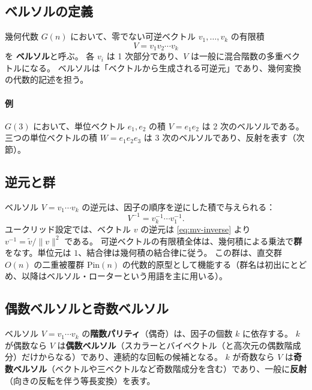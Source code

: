 \documentclass[dvipdfmx,a4paper,oneside]{jsbook}
\numberwithin{equation}{chapter}
\begin{document}
\subsection{ベルソルの定義}

幾何代数 \(G(n)\) において、零でない可逆ベクトル \(v_1,\ldots,v_k\) の有限積
\begin{equation}
  V = v_1 v_2 \cdots v_k
  \label{eq:versor-def}
\end{equation}
を \textbf{ベルソル}と呼ぶ。
各 \(v_i\) は 1 次部分であり、\(V\) は一般に混合階数の多重ベクトルになる。
ベルソルは「ベクトルから生成される可逆元」であり、幾何変換の代数的記述を担う。

\paragraph{例}
\(G(3)\) において、単位ベクトル \(e_1,e_2\) の積 \(V = e_1 e_2\) は 2 次のベルソルである。
三つの単位ベクトルの積 \(W = e_1 e_2 e_3\) は 3 次のベルソルであり、反射を表す（次節）。

\subsection{逆元と群}

ベルソル \(V = v_1\cdots v_k\) の逆元は、因子の順序を逆にした積で与えられる：
\begin{equation}
  V^{-1} = v_k^{-1} \cdots v_1^{-1}.
  \label{eq:versor-inverse}
\end{equation}
ユークリッド設定では、ベクトル \(v\) の逆元は \eqref{eq:mv-inverse} より \(v^{-1} = \widetilde{v}/\|v\|^2\) である。
可逆ベクトルの有限積全体は、幾何積による乗法で\textbf{群}をなす。単位元は \(1\)、結合律は幾何積の結合律に従う。
この群は、直交群 \(O(n)\) の二重被覆群 \(\mathrm{Pin}(n)\) の代数的原型として機能する（群名は初出にとどめ、以降はベルソル・ローターという用語を主に用いる）。

\subsection{偶数ベルソルと奇数ベルソル}

ベルソル \(V = v_1\cdots v_k\) の\textbf{階数パリティ}（偶奇）は、因子の個数 \(k\) に依存する。
\(k\) が偶数なら \(V\) は\textbf{偶数ベルソル}（スカラーとバイベクトル（と高次元の偶数階成分）だけからなる）であり、連続的な回転の候補となる。
\(k\) が奇数なら \(V\) は\textbf{奇数ベルソル}（ベクトルや三ベクトルなど奇数階成分を含む）であり、一般に\textbf{反射}（向きの反転を伴う等長変換）を表す。
\end{document}
